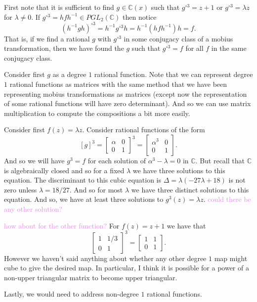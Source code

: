 \documentclass[12pt,letterpaper,boxed]{hmcpset}
\newcommand{\wg}[1]{\textcolor{violet}{#1}}
\newcommand{\C}{\mathbb C}
\newcommand{\inv}{^{-1}}
\newenvironment{wgenv}{\color{violet}}{}
\begin{document}
\begin{solution}
First note that it is sufficient to find $g \in \C(x)$ such that
$g^{\circ 3} = z + 1$ or $g^{\circ 3} = \lambda z$ for $\lambda \neq
0$.
If $g^{\circ 3} = h f h\inv \in PGL_2(\C)$ then notice 
\[
	(h\inv g h)^{\circ 3} = h\inv g^{\circ 3} h 
		= h\inv (h f h\inv) h	
		= f.
\]
That is, if we find a rational $g$ with $g^{\circ 3}$ in some
conjugacy class of a mobius transformation, then we have found the $g$
such that $g^{\circ 3} = f$ for all $f$ in the same conjugacy class.

Consider first $g$ as a degree $1$ rational function.
Note that we can represent degree $1$ rational functions as matrices with the
same method that we have been representing mobius transformations as
matrices (except now the representation of some rational functions
will have zero determinant). And so we can use matrix multiplication
to compute the compositions a bit more easily.

Consider first $f(z) = \lambda z$. Consider rational functions of the
form 
\[
	[g]^3 = \begin{bmatrix}
		\alpha & 0 \\ 0 & 1
	\end{bmatrix}^3 
	= \begin{bmatrix}
		\alpha^3 & 0 \\ 0 & 1
	\end{bmatrix}. 
\]
And so we will have $g^3 =f$ for each solution of $\alpha^3 - \lambda
= 0$ in $\C$. But recall that $\C$ is algebraically closed and so for
a fixed $\lambda$ we have three solutions to this equation. 
The discriminant to this cubic equation is $\Delta =
\lambda(-27\lambda + 18)$ is not zero unless $\lambda = 18/27$. 
And so for most $\lambda$ we have three distinct solutions to this
equation.
And so, we have at
least three solutions to $g^3(z) = \lambda z$.
\wg{could there be any other solution?}

\wg{how about for the other function?}
\begin{wgenv}
	For $f(z) = z + 1$ we have that 
	\[
	\begin{bmatrix}
		1 & 1/3 \\ 0 & 1
	\end{bmatrix}^3 =
	\begin{bmatrix}
		1 & 1 \\ 0 & 1
	\end{bmatrix}.
	\]
	However we haven't said anything about whether 
	any other degree $1$ map might cube to give the desired map.
	In particular, I think it is possible for a power of a non-upper triangular
	matrix to become upper triangular.

	Lastly, we would need to address non-degree $1$ rational functions.
\end{wgenv}

\end{solution}
\end{document}
